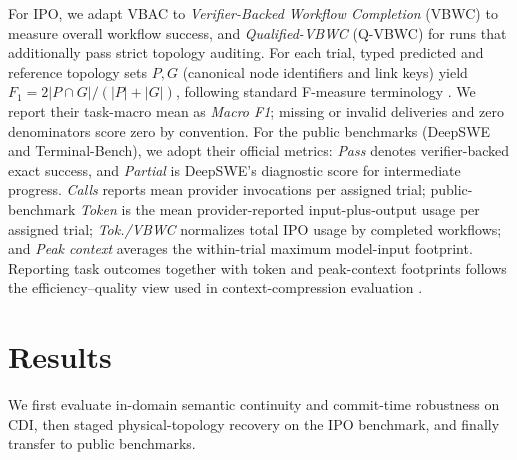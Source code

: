For IPO, we adapt VBAC to \emph{Verifier-Backed Workflow Completion} (VBWC) to measure overall workflow success, and \emph{Qualified-VBWC} (Q-VBWC) for runs that additionally pass strict topology auditing. For each trial, typed predicted and reference topology sets $P,G$ (canonical node identifiers and link keys) yield $F_1=2|P\cap G|/(|P|+|G|)$, following standard F-measure terminology \cite{sokolova2009performance}. We report their task-macro mean as \emph{Macro F1}; missing or invalid deliveries and zero denominators score zero by convention.
For the public benchmarks (DeepSWE and Terminal-Bench), we adopt their official metrics: \emph{Pass} denotes verifier-backed exact success, and \emph{Partial} is DeepSWE's diagnostic score for intermediate progress. \emph{Calls} reports mean provider invocations per assigned trial; public-benchmark \emph{Token} is the mean provider-reported input-plus-output usage per assigned trial; \emph{Tok./VBWC} normalizes total IPO usage by completed workflows; and \emph{Peak context} averages the within-trial maximum model-input footprint.
Reporting task outcomes together with token and peak-context footprints follows the efficiency--quality view used in context-compression evaluation \cite{selectivecontext}.
\section{Results}
\label{sec:results}
We first evaluate in-domain semantic continuity and commit-time robustness on CDI, then staged physical-topology recovery on the IPO benchmark, and finally transfer to public benchmarks.
